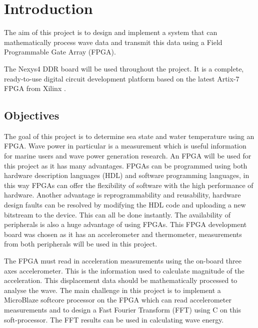\documentclass[12pt,a4paper]{report} %
\begin{document}
\tableofcontents
\listoffigures
\begingroup
\let\clearpage\relax
\lstlistoflistings
\endgroup
\chapter{Introduction}
The aim of this project is to design and implement a system that can mathematically process wave data and transmit this data using a Field Programmable Gate Array (FPGA).

The Nexys4 DDR board will be used throughout the project. It is a complete, ready-to-use digital circuit development platform based on the latest Artix-7 FPGA from Xilinx \cite{nexys}.

\section{Objectives}
The goal of this project is to determine sea state and water temperature using an FPGA.
Wave power in particular is a measurement which is useful information for marine users and wave power generation research. 
An FPGA will be used for this project as it has many advantages.
FPGAs can be programmed using both hardware description languages (HDL) and software programming languages, in this way FPGAs can offer the flexibility of software with the high performance of hardware.
Another advantage is reprogrammability and reusability, hardware design faults can be resolved by modifying the HDL code and uploading a new bitstream to the device.
This can all be done instantly.
The availability of peripherals is also a huge advantage of using FPGAs.
This FPGA development board was chosen as it has an accelerometer and thermometer, measurements from both peripherals will be used in this project.

The FPGA must read in acceleration measurements using the on-board three axes accelerometer.
This is the information used to calculate magnitude of the acceleration.
This displacement data should be mathematically processed to analyse the wave.
The main challenge in this project is to implement a MicroBlaze softcore processor on the FPGA which can read accelerometer measurements and to design a Fast Fourier Transform (FFT) using C on this soft-processor.
The FFT results can be used in calculating wave energy.
\end{document}
